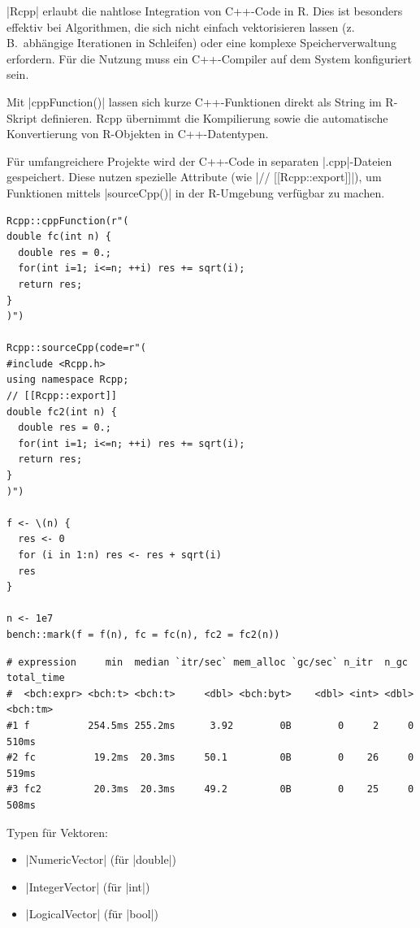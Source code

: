 \documentclass[10pt,twocolumn]{scrartcl}
\renewcommand{\lstinline}{\mycoloredinline}
\begin{document}
\lstinline|Rcpp| erlaubt die nahtlose Integration von C++-Code in R. Dies ist besonders effektiv bei Algorithmen, die sich nicht einfach vektorisieren lassen (z.\,B.\ abhängige Iterationen in Schleifen) oder eine komplexe Speicherverwaltung erfordern. Für die Nutzung muss ein C++-Compiler auf dem System konfiguriert sein.

Mit \lstinline|cppFunction()| lassen sich kurze C++-Funktionen direkt als String im R-Skript definieren. Rcpp übernimmt die Kompilierung sowie die automatische Konvertierung von R-Objekten in C++-Datentypen.

Für umfangreichere Projekte wird der C++-Code in separaten \lstinline|.cpp|-Dateien gespeichert. Diese nutzen spezielle Attribute (wie \lstinline|// [[Rcpp::export]]|), um Funktionen mittels \lstinline|sourceCpp()| in der R-Umgebung verfügbar zu machen.

\begin{lstlisting}
Rcpp::cppFunction(r"(
double fc(int n) {
  double res = 0.;
  for(int i=1; i<=n; ++i) res += sqrt(i);
  return res;
}
)")

Rcpp::sourceCpp(code=r"(
#include <Rcpp.h>
using namespace Rcpp;
// [[Rcpp::export]]
double fc2(int n) {
  double res = 0.;
  for(int i=1; i<=n; ++i) res += sqrt(i);
  return res;
}
)")

f <- \(n) {
  res <- 0
  for (i in 1:n) res <- res + sqrt(i)
  res
}

n <- 1e7
bench::mark(f = f(n), fc = fc(n), fc2 = fc2(n))
\end{lstlisting}
\begin{lstlisting}[aboveskip=-2pt,basicstyle=\fontsize{7.9pt}{8.2pt}\selectfont\ttfamily]
# expression     min  median `itr/sec` mem_alloc `gc/sec` n_itr  n_gc total_time
#  <bch:expr> <bch:t> <bch:t>     <dbl> <bch:byt>    <dbl> <int> <dbl>   <bch:tm>
#1 f          254.5ms 255.2ms      3.92        0B        0     2     0      510ms
#2 fc          19.2ms  20.3ms     50.1         0B        0    26     0      519ms
#3 fc2         20.3ms  20.3ms     49.2         0B        0    25     0      508ms
\end{lstlisting}

Typen für Vektoren:
\begin{itemize}
\item \lstinline|NumericVector| (für \lstinline|double|)
\item \lstinline|IntegerVector| (für \lstinline|int|)
\item \lstinline|LogicalVector| (für \lstinline|bool|)
\end{itemize}
\end{document}
